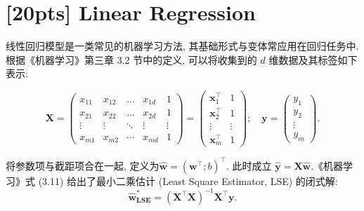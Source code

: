 \documentclass[a4paper,UTF8]{article}
\numberwithin{equation}{section}
\theoremstyle{definition}
\def \X {\mathbf{X}}
\def \w {\hat{\boldsymbol{w}}}
\def \y {\mathbf{y}}
\def \x {\mathbf{x}}
\begin{document}
\section{[20pts] Linear Regression}
 线性回归模型是一类常见的机器学习方法, 其基础形式与变体常应用在回归任务中. 根据《机器学习》第三章 3.2 节中的定义, 可以将收集到的 $d$ 维数据及其标签如下表示: 

\[
\X=\left(\begin{array}{ccccc}
x_{11} & x_{12} & \ldots & x_{1 d} & 1 \\
x_{21} & x_{22} & \ldots & x_{2 d} & 1 \\
\vdots & \vdots & \ddots & \vdots & \vdots \\
x_{m 1} & x_{m 2} & \cdots & x_{m d} & 1
\end{array}\right)
=
\left(\begin{array}{cc}
\x_1^{\top} & 1 \\
\x_2^{\top} & 1 \\
\vdots & \vdots \\
\x_m^{\top} & 1
\end{array}\right)
;\quad \y 
=
\left(\begin{array}{c}
y_1\\
y_2\\
\vdots\\
y_m
\end{array}\right).
\]

将参数项与截距项合在一起, 定义为$\w=
\left(
\boldsymbol{w}^\top; b\right)^\top$. 此时成立 $\hat{\y} = \X\w$.《机器学习》式 (3.11) 给出了最小二乘估计 (Least Square Estimator, LSE) 的闭式解: 
\begin{equation}
    \label{eq:LSE}
    \w_{\textbf{LSE}}^* = \left(\X^\top\X\right)^{-1}\X^\top\y.
\end{equation}
  
\end{document}
